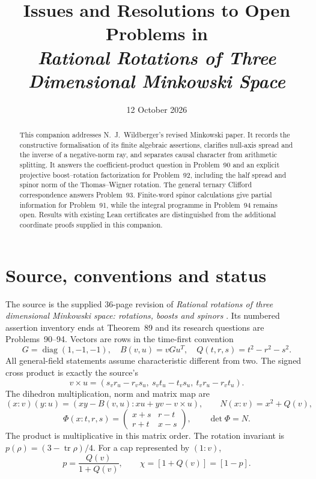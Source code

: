 \documentclass[11pt]{article}
\title{Issues and Resolutions to Open Problems in\\
  \emph{Rational Rotations of Three Dimensional Minkowski Space}}
\author{}
\date{12 October 2026}
\newcommand{\tr}{\operatorname{tr}}
\theoremstyle{remark}
\begin{document}
\maketitle
\begin{abstract}
This companion addresses N.~J.~Wildberger's revised Minkowski paper.
It records the constructive
formalisation of its finite algebraic assertions, clarifies null-axis spread
and the inverse of a negative-norm ray, and separates causal character from
arithmetic splitting. It answers the coefficient-product
question in Problem~90 and an explicit projective boost--rotation
factorization for Problem~92, including the half spread and spinor norm of
the Thomas--Wigner rotation. The general ternary Clifford correspondence
answers Problem~93. Finite-word spinor calculations give partial information
for Problem~91, while the integral programme in Problem~94 remains open.
Results with existing Lean certificates are distinguished from the
additional coordinate proofs supplied in this companion.
\end{abstract}

\section{Source, conventions and status}

The source is the supplied 36-page revision of \emph{Rational rotations of
three dimensional Minkowski space: rotations, boosts and spinors}
\cite{source}. Its numbered assertion inventory ends at Theorem~89 and its
research questions are Problems~90--94. Vectors are rows in the time-first
convention
\[
 G=\operatorname{diag}(1,-1,-1),\quad
 B(v,u)=vGu^T,\quad Q(t,r,s)=t^2-r^2-s^2.
\]
All general-field statements assume characteristic different from two.
The signed cross product is exactly the source's
\[
 v\times u=(s_vr_u-r_vs_u,\ s_vt_u-t_vs_u,\ t_vr_u-r_vt_u).
\]
The dihedron multiplication, norm and matrix map are
\begin{equation}
 (x:v)(y:u)=(xy-B(v,u):xu+yv-v\times u),\qquad
 N(x:v)=x^2+Q(v),
 \label{eq:product}
\end{equation}
\begin{equation}
 \Phi(x:t,r,s)=
 \begin{pmatrix}x+s&r-t\\r+t&x-s\end{pmatrix},
 \qquad\det\Phi=N.
 \label{eq:matrix}
\end{equation}
The product is multiplicative in this matrix order. The rotation invariant
is \(p(\rho)=(3-\tr\rho)/4\). For a cap represented by \((1:v)\),
\[
 p=\frac{Q(v)}{1+Q(v)},\qquad \chi=[1+Q(v)]=[1-p].
\]
\end{document}
